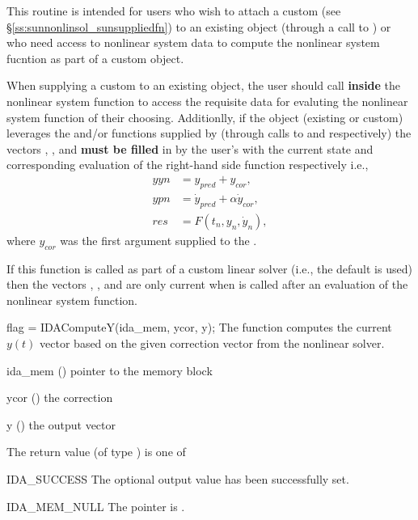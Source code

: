 {
  This routine is intended for users who wish to attach a custom
   (see \S\ref{ss:sunnonlinsol_sunsuppliedfn}) to an
  existing  object (through a call to
  ) or who need access to nonlinear system data to
  compute the nonlinear system fucntion as part of a custom
   object.

  When supplying a custom  to an existing
   object, the user should call
   \textbf{inside} the nonlinear system
  function to access the requisite data for evaluting the nonlinear system
  function of their choosing. Additionlly, if the  object
  (existing or custom) leverages the  and/or
   functions supplied by {\ida} (through calls to
   and  respectively)
  the vectors , , and  \textbf{must be filled} in by the
  user's  with the current state and corresponding
  evaluation of the right-hand side function respectively i.e.,
  \begin{align*}
    yyn &= y_{pred} + y_{cor}, \\
    ypn &= \dot{y}_{pred} + \alpha \dot{y}_{cor}, \\
    res &= F\left(t_{n}, y_n, \dot{y}_n\right),
  \end{align*}
  where $y_{cor}$ was the first argument supplied to the .

  If this function is called as part of a custom linear solver (i.e., the
  default  is used) then the vectors , ,
  and  are only current when  is called
  after an evaluation of the nonlinear system function.
}

{
  flag = IDAComputeY(ida\_mem, ycor, y);
}
{
  The function computes the current $y(t)$ vector based on the given correction
  vector from the nonlinear solver.
}
{
  \begin{args}
    \item[ida\_mem] () pointer to the {\ida} memory block
    \item[ycor] () the correction
    \item[y] () the output vector
  \end{args}
}
{
  The return value  (of type ) is one of
  \begin{args}
  \item[IDA\_SUCCESS]
    The optional output value has been successfully set.
  \item[IDA\_MEM\_NULL]
    The  pointer is .
  \end{args}
}
{}


